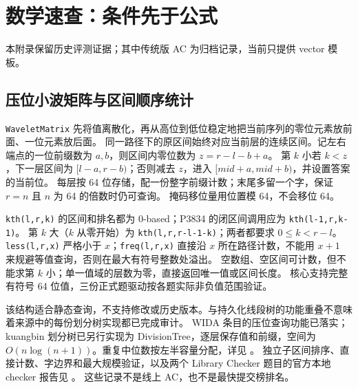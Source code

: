 \chapter{数学速查：条件先于公式}
\noindent 本附录保留历史评测证据；其中传统版 AC 为归档记录，当前只提供 vector 模板。































\clearpage




















\section{压位小波矩阵与区间顺序统计}
\texttt{WaveletMatrix} 先将值离散化，再从高位到低位稳定地把当前序列的零位元素放前面、一位元素放后面。
同一路径下的原区间始终对应当前层的连续区间。记左右端点的一位前缀数为 $a,b$，则区间内零位数为 $z=r-l-b+a$。
第 $k$ 小若 $k<z$，下一层区间为 $[l-a,r-b)$；否则减去 $z$，进入 $[mid+a,mid+b)$，并设置答案的当前位。
每层按 64 位存储，配一份整字前缀计数；末尾多留一个字，保证 $r=n$ 且 $n$ 为 64 的倍数时仍可查询。
掩码移位量用位置模 64，不会移位 64。

\texttt{kth(l,r,k)} 的区间和排名都为 0-based；P3834 的闭区间调用应为 \texttt{kth(l-1,r,k-1)}。
第 $k$ 大（$k$ 从零开始）为 \texttt{kth(l,r,r-l-1-k)}；两者都要求 $0\le k<r-l$。
\texttt{less(l,r,x)} 严格小于 $x$；\texttt{freq(l,r,x)} 直接沿 $x$ 所在路径计数，不能用 $x+1$ 来规避等值查询，否则在最大有符号整数处溢出。
空数组、空区间可计数，但不能求第 $k$ 小；单一值域的层数为零，直接返回唯一值或区间长度。
核心支持完整有符号 64 位值，三份正式题驱动按各题实际非负值范围验证。

该结构适合静态查询，不支持修改或历史版本。与持久化线段树的功能重叠不意味着来源中的每份划分树实现都已完成审计。
WIDA 条目的压位查询功能已落实；kuangbin 划分树已另行实现为 DivisionTree，逐层保存值和前缀，空间为 $O(n\log(n+1))$。重复中位数按左半容量分配，详见 。
独立子区间排序、直接计数、字边界和最大规模验证，以及两个 Library Checker 题目的官方本地 checker 报告见 。
这些记录不是线上 AC，也不是最快提交榜排名。
